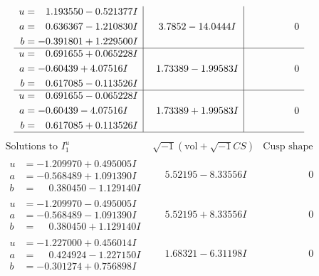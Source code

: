 \documentclass[1p]{elsarticle_modified}
\theoremstyle{definition}
\newcommand{\I}{\sqrt{-1}}
\begin{document}
$$\begin{array}{c|c|c}
\begin{aligned}
u &= \phantom{-}1.193550 - 0.521377 I \\
a &= \phantom{-}0.636367 - 1.210830 I \\
b &= -0.391801 + 1.229500 I\end{aligned}
 & \phantom{-}3.7852 - 14.0444 I & \phantom{-0.000000 } 0 \\ \hline\begin{aligned}
u &= \phantom{-}0.691655 + 0.065228 I \\
a &= -0.60439 + 4.07516 I \\
b &= \phantom{-}0.617085 - 0.113526 I\end{aligned}
 & \phantom{-}1.73389 - 1.99583 I & \phantom{-0.000000 } 0 \\ \hline\begin{aligned}
u &= \phantom{-}0.691655 - 0.065228 I \\
a &= -0.60439 - 4.07516 I \\
b &= \phantom{-}0.617085 + 0.113526 I\end{aligned}
 & \phantom{-}1.73389 + 1.99583 I & \phantom{-0.000000 } 0\\
 \hline 
 \end{array}$$\newpage$$\begin{array}{c|c|c}  
\text{Solutions to }I^u_{1}& \I (\text{vol} + \sqrt{-1}CS) & \text{Cusp shape}\\
 \hline 
\begin{aligned}
u &= -1.209970 + 0.495005 I \\
a &= -0.568489 + 1.091390 I \\
b &= \phantom{-}0.380450 - 1.129140 I\end{aligned}
 & \phantom{-}5.52195 - 8.33556 I & \phantom{-0.000000 } 0 \\ \hline\begin{aligned}
u &= -1.209970 - 0.495005 I \\
a &= -0.568489 - 1.091390 I \\
b &= \phantom{-}0.380450 + 1.129140 I\end{aligned}
 & \phantom{-}5.52195 + 8.33556 I & \phantom{-0.000000 } 0 \\ \hline\begin{aligned}
u &= -1.227000 + 0.456014 I \\
a &= \phantom{-}0.424924 - 1.227150 I \\
b &= -0.301274 + 0.756898 I\end{aligned}
 & \phantom{-}1.68321 - 6.31198 I & \phantom{-0.000000 } 0 \\ \hline\begin{aligned}

\end{aligned}
\end{array}$$
\end{document}
